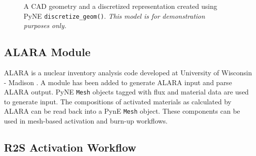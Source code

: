 \documentclass{anstrans}
\begin{document}
\begin{figure}
\centering
{}
\caption{A CAD geometry and a
discretized representation created using PyNE \texttt{discretize\_geom()}.
\textit{This model is for demonstration purposes only.}}
\label{mobius}
\end{figure}


\subsection{ALARA Module}

ALARA is a nuclear inventory analysis code developed at University of Wisconsin
- Madison \cite{wilson_validation_1998}. A module has been added to generate
  ALARA input and parse ALARA output. PyNE
\texttt{Mesh} objects tagged with flux and material data are used to generate
input. The compositions of activated materials as calculated by
ALARA can be read back into a PynE \texttt{Mesh} object. These components can be used
in mesh-based activation and burn-up workflows.

\subsection{R2S Activation Workflow}
\end{document}
